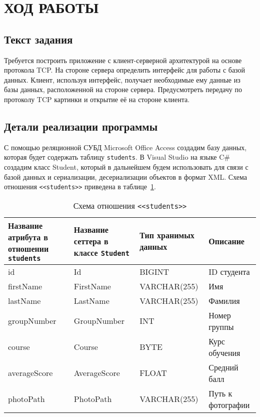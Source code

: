 \section{ХОД РАБОТЫ}

\subsection{Текст задания}

Требуется построить приложение с клиент-серверной архитектурой на основе протокола TCP.
На стороне сервера определить интерфейс для работы с базой данных.
Клиент, используя интерфейс, получает необходимые ему данные из базы данных,
расположенной на стороне сервера. Предусмотреть передачу по протоколу TCP
картинки и открытие её на стороне клиента.

\subsection{Детали реализации программы}

С помощью реляционной СУБД Microsoft Office Access создадим базу данных, которая
будет содержать таблицу \texttt{students}. В Visual Studio на языке C\# создадим
класс Student, который в дальнейшем будем использовать для связи с базой данных и
сериализации, десериализации объектов в формат XML. Схема отношения \texttt{<<students>>}
приведена в таблице~\ref{tbl:students_scheme}.

\begin{table}[h!]
  \caption{Схема отношения \texttt{<<students>>}}
  \label{tbl:students_scheme}
  \small{
    \centering
    \begin{tabular}{| p{} | p{} | p{} | p{} |}
      \hline
      Название атрибута в \newline отношении \texttt{students} &
      Название сеттера в \newline классе \texttt{Student} &
      Тип хранимых данных  &
      Описание \\

      \hline
      id & Id & BIGINT & ID студента \\

      \hline
      firstName & FirstName & VARCHAR(255) & Имя \\

      \hline
      lastName & LastName & VARCHAR(255) & Фамилия  \\

      \hline
      groupNumber & GroupNumber & INT & Номер группы \\

      \hline
      course & Course & BYTE & Курс обучения \\

      \hline
      averageScore & AverageScore & FLOAT & Средний балл \\

      \hline
      photoPath & PhotoPath & VARCHAR(255) & Путь к фотографии \\

      \hline
    \end{tabular}
  }
\end{table}


